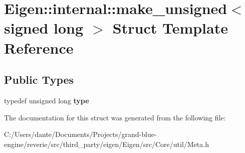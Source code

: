 \hypertarget{struct_eigen_1_1internal_1_1make__unsigned_3_01signed_01long_01_4}{}\section{Eigen\+::internal\+::make\+\_\+unsigned$<$ signed long $>$ Struct Template Reference}
\label{struct_eigen_1_1internal_1_1make__unsigned_3_01signed_01long_01_4}
\subsection*{Public Types}
\begin{DoxyCompactItemize}
\item 
\mbox{\label{struct_eigen_1_1internal_1_1make__unsigned_3_01signed_01long_01_4_aeaef24a19952145315f1cb4120ef14d2}} 
typedef unsigned long {\bfseries type}
\end{DoxyCompactItemize}


The documentation for this struct was generated from the following file\+:\begin{DoxyCompactItemize}
\item 
C\+:/\+Users/dante/\+Documents/\+Projects/grand-\/blue-\/engine/reverie/src/third\+\_\+party/eigen/\+Eigen/src/\+Core/util/Meta.\+h\end{DoxyCompactItemize}
